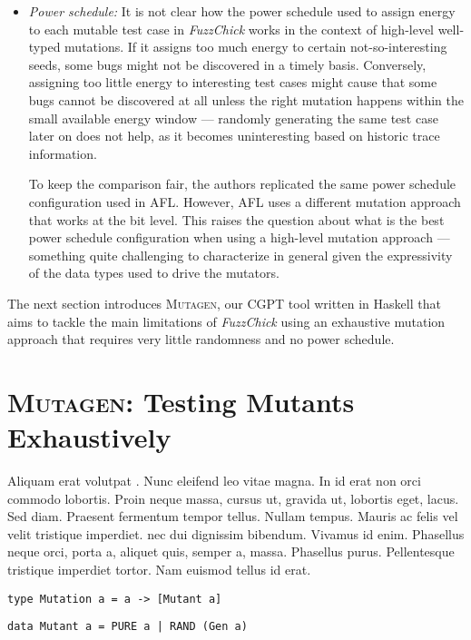 \documentclass[acmsmall, anonymous]{acmart}
\newcommand{\fuzzchick}{\textit{FuzzChick}\xspace}
\newcommand{\mutagen}{\textsc{Mutagen}\xspace}
\begin{document}
\begin{itemize}
\item \emph{Power schedule:} It is not clear how the power schedule used to
  assign energy to each mutable test case in \fuzzchick works in the context of
  high-level well-typed mutations.
  If it assigns too much energy to certain not-so-interesting seeds, some bugs
  might not be discovered in a timely basis.
  Conversely, assigning too little energy to interesting test cases might cause
  that some bugs cannot be discovered at all unless the right mutation happens
  within the small available energy window --- randomly generating the same test
  case later on does not help, as it becomes uninteresting based on historic
  trace information.

  To keep the comparison fair, the authors replicated the same power schedule
  configuration used in AFL.
  However, AFL uses a different mutation approach that works at the bit level.
  This raises the question about what is the best power schedule configuration
  when using a high-level mutation approach --- something quite challenging to
  characterize in general given the expressivity of the data types used to
  drive the mutators.
\end{itemize}

The next section introduces \mutagen, our CGPT tool written in Haskell that aims
to tackle the main limitations of \fuzzchick using an exhaustive mutation
approach that requires very little randomness and no power schedule.

\section{\mutagen: Testing Mutants Exhaustively}
\label{sec:mutagen}

Aliquam erat volutpat \citep{devai2013edsl}. Nunc eleifend leo vitae magna. In
id erat non orci commodo lobortis. Proin neque massa, cursus ut, gravida ut,
lobortis eget, lacus. Sed diam. Praesent fermentum tempor tellus. Nullam tempus.
Mauris ac felis vel velit tristique imperdiet.
nec dui dignissim bibendum. Vivamus id enim. Phasellus neque orci, porta a,
aliquet quis, semper a, massa. Phasellus purus. Pellentesque tristique imperdiet
tortor. Nam euismod tellus id erat.

\begin{verbatim}
type Mutation a = a -> [Mutant a]
\end{verbatim}

\begin{verbatim}
data Mutant a = PURE a | RAND (Gen a)
\end{verbatim}
\end{document}
